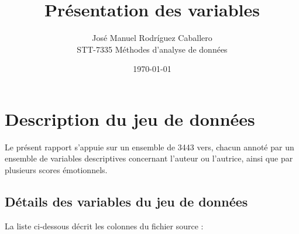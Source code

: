 \documentclass[12pt,a4paper]{article}
\title{Présentation des variables}
\author{José Manuel Rodríguez Caballero \\
	\small{STT-7335 Méthodes d'analyse de données}}
\date{\today}
\begin{document}
	\maketitle
	\tableofcontents
	
\section{Description du jeu de données}

Le présent rapport s’appuie sur un ensemble de 3443 vers, chacun annoté par un ensemble
de variables descriptives concernant l’auteur ou l’autrice, ainsi que par plusieurs
scores émotionnels.

\subsection{Détails des variables du jeu de données}
La liste ci-dessous décrit les colonnes du fichier source :
\end{document}
